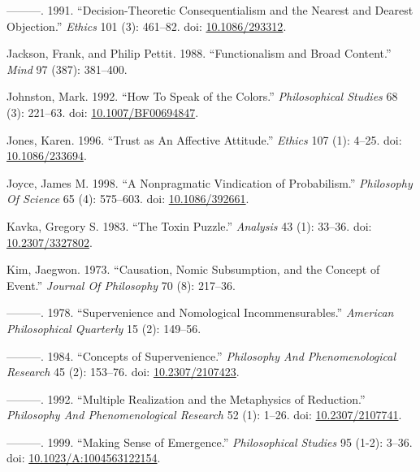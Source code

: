 \documentclass[
  10pt,
  letterpaper,
  DIV=11,
  numbers=noendperiod,
  twoside]{scrartcl}
\newlength{\cslhangindent}
\newenvironment{CSLReferences}[2] %
 {\begin{list}{}{%
  \setlength{\itemindent}{0pt}
  \setlength{\leftmargin}{0pt}
  \setlength{\parsep}{0pt}
  \ifodd #1
   \setlength{\leftmargin}{\cslhangindent}
   \setlength{\itemindent}{-1\cslhangindent}
  \fi
  \setlength{\itemsep}{#2\baselineskip}}}
 {\end{list}}
\begin{document}
\begin{CSLReferences}{1}{0}
---------. 1991. {``Decision-Theoretic Consequentialism and the Nearest
and Dearest Objection.''} \emph{Ethics} 101 (3): 461--82. doi:
\href{https://doi.org/10.1086/293312}{10.1086/293312}.

Jackson, Frank, and Philip Pettit. 1988. {``Functionalism and Broad
Content.''} \emph{Mind} 97 (387): 381--400.

Johnston, Mark. 1992. {``How To Speak of the Colors.''}
\emph{Philosophical Studies} 68 (3): 221--63. doi:
\href{https://doi.org/10.1007/BF00694847}{10.1007/BF00694847}.

Jones, Karen. 1996. {``Trust as An Affective Attitude.''} \emph{Ethics}
107 (1): 4--25. doi:
\href{https://doi.org/10.1086/233694}{10.1086/233694}.

Joyce, James M. 1998. {``A Nonpragmatic Vindication of Probabilism.''}
\emph{Philosophy Of Science} 65 (4): 575--603. doi:
\href{https://doi.org/10.1086/392661}{10.1086/392661}.

Kavka, Gregory S. 1983. {``The Toxin Puzzle.''} \emph{Analysis} 43 (1):
33--36. doi: \href{https://doi.org/10.2307/3327802}{10.2307/3327802}.

Kim, Jaegwon. 1973. {``Causation, Nomic Subsumption, and the Concept of
Event.''} \emph{Journal Of Philosophy} 70 (8): 217--36.

---------. 1978. {``Supervenience and Nomological Incommensurables.''}
\emph{American Philosophical Quarterly} 15 (2): 149--56.

---------. 1984. {``Concepts of Supervenience.''} \emph{Philosophy And
Phenomenological Research} 45 (2): 153--76. doi:
\href{https://doi.org/10.2307/2107423}{10.2307/2107423}.

---------. 1992. {``Multiple Realization and the Metaphysics of
Reduction.''} \emph{Philosophy And Phenomenological Research} 52 (1):
1--26. doi: \href{https://doi.org/10.2307/2107741}{10.2307/2107741}.

---------. 1999. {``Making Sense of Emergence.''} \emph{Philosophical
Studies} 95 (1-2): 3--36. doi:
\href{https://doi.org/10.1023/A:1004563122154}{10.1023/A:1004563122154}.


\end{CSLReferences}
\end{document}

